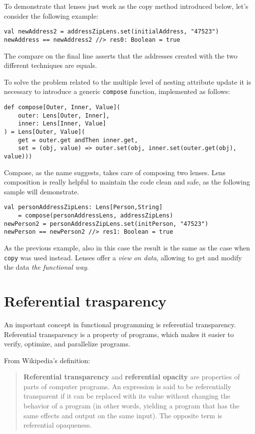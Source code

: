 To demonstrate that lenses just work as the copy method introduced below,
let's consider the following example:

\begin{verbatim}
val newAddress2 = addressZipLens.set(initialAddress, "47523")
newAddress == newAddress2 //> res0: Boolean = true
\end{verbatim}

The compare on the final line asserts that the addresses created with
the two different techniques are equals.

To solve the problem related to the multiple level of nesting attribute
update it is necessary to introduce a generic \texttt{compose} function,
implemented as follows:

\begin{verbatim}
def compose[Outer, Inner, Value](
    outer: Lens[Outer, Inner],
    inner: Lens[Inner, Value]
) = Lens[Outer, Value](
    get = outer.get andThen inner.get,
    set = (obj, value) => outer.set(obj, inner.set(outer.get(obj), value)))
\end{verbatim}

Compose, as the name suggests, takes care of composing two lenses. Lens
composition is really helpful to maintain the code clean and safe, as the
following sample will demonstrate.

\begin{verbatim}
val personAddressZipLens: Lens[Person,String] 
	= compose(personAddressLens, addressZipLens)
newPerson2 = personAddressZipLens.set(initPerson, "47523")
newPerson == newPerson2 //> res1: Boolean = true
\end{verbatim}

As the previous example, also in this case the result is the same as the
case when \texttt{copy} was used instead. Lenses offer a \emph{view on
data}, allowing to get and modify the data \emph{the functional way}.

\section{Referential trasparency}\label{referential-trasparency}

An important concept in functional programming is referential
transparency. Referential transparency is a property of programs, which
makes it easier to verify, optimize, and parallelize programs.

From Wikipedia's definition:

\begin{quote}
\textbf{Referential transparency} and \textbf{referential opacity} are
properties of parts of computer programs. An expression is said to be
referentially transparent if it can be replaced with its value without
changing the behavior of a program (in other words, yielding a program
that has the same effects and output on the same input). The opposite
term is referential opaqueness.
\end{quote}

